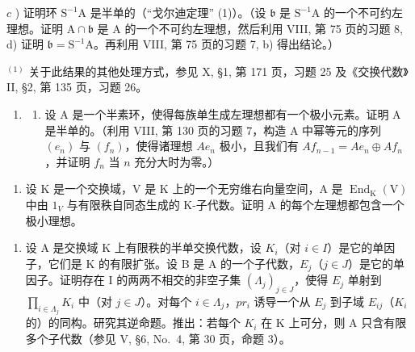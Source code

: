 \(c\) ) 证明环 \(\mathrm{S}^{-1}\mathrm{A}\) 是半单的（``戈尔迪定理'' (1)）。（设 \(\mathfrak{b}\) 是 \(\mathrm{S}^{-1}\mathrm{A}\) 的一个不可约左理想。证明 \(\mathrm{A} \cap \mathfrak{b}\) 是 A 的一个不可约左理想，然后利用 VIII, 第 75 页的习题 8, d) 证明 \(\mathfrak{b} = \mathrm{S}^{-1}\mathrm{A}\)。再利用 VIII, 第 75 页的习题 7, b) 得出结论。）

\( ^{(1)} \) 关于此结果的其他处理方式，参见 X, §1, 第 171 页，习题 25 及《交换代数》II, §2, 第 135 页，习题 26。

\begin{enumerate}
\def\labelenumi{\arabic{enumi})}
\setcounter{enumi}{4}
\tightlist
\item
  \begin{enumerate}
  \def\labelenumii{\alph{enumii})}
  \tightlist
  \item
    设 A 是一个半素环，使得每族单生成左理想都有一个极小元素。证明 A 是半单的。（利用 VIII, 第 130 页的习题 7，构造 A 中幂等元的序列 \((e_n)\) 与 \((f_n)\)，使得诸理想 \(Ae_n\) 极小，且我们有 \(A f_{n-1} = Ae_n \oplus Af_n\)，并证明 \(f_n\) 当 \(n\) 充分大时为零。）
  \end{enumerate}
\end{enumerate}

\begin{enumerate}
\def\labelenumi{\alph{enumi})}
\setcounter{enumi}{1}
\tightlist
\item
  设 K 是一个交换域，V 是 K 上的一个无穷维右向量空间，A 是 \(\operatorname{End}_{\mathrm{K}}(\mathrm{V})\) 中由 \(1_{V}\) 与有限秩自同态生成的 K-子代数。证明 A 的每个左理想都包含一个极小理想。
\end{enumerate}

\begin{enumerate}
\def\labelenumi{\arabic{enumi})}
\setcounter{enumi}{5}
\tightlist
\item
  设 A 是交换域 K 上有限秩的半单交换代数，设 \(K_{i}\)（对 \(i \in I\)）是它的单因子，它们是 K 的有限扩张。设 B 是 A 的一个子代数，\(E_{j}\)（\(j \in J\)）是它的单因子。证明存在 I 的两两不相交的非空子集 \((\Lambda_{j})_{j \in J}\)，使得 \(E_{j}\) 单射到 \(\prod_{i \in \Lambda_{j}} K_{i}\) 中（对 \(j \in J\)）。对每个 \(i \in \Lambda_{j}\)，\(pr_{i}\) 诱导一个从 \(E_{j}\) 到子域 \(E_{ij}\)（\(K_{i}\) 的）的同构。研究其逆命题。推出：若每个 \(K_{i}\) 在 K 上可分，则 A 只含有限多个子代数（参见 V, §6, No.~4, 第 30 页，命题 3）。
\end{enumerate}

